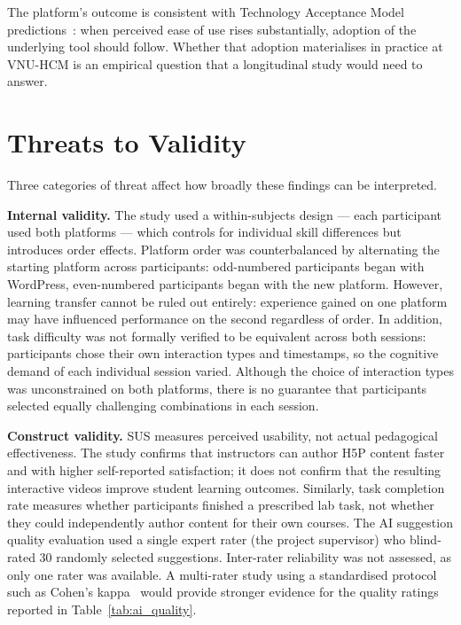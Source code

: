 The platform's outcome is consistent with Technology Acceptance Model predictions~\cite{davis1989}: when perceived ease of use rises substantially, adoption of the underlying tool should follow. Whether that adoption materialises in practice at VNU-HCM is an empirical question that a longitudinal study would need to answer.

\clearpage
\section{Threats to Validity}

Three categories of threat affect how broadly these findings can be interpreted.

\textbf{Internal validity.} The study used a within-subjects design --- each participant used both platforms --- which controls for individual skill differences but introduces order effects. Platform order was counterbalanced by alternating the starting platform across participants: odd-numbered participants began with WordPress, even-numbered participants began with the new platform. However, learning transfer cannot be ruled out entirely: experience gained on one platform may have influenced performance on the second regardless of order. In addition, task difficulty was not formally verified to be equivalent across both sessions: participants chose their own interaction types and timestamps, so the cognitive demand of each individual session varied. Although the choice of interaction types was unconstrained on both platforms, there is no guarantee that participants selected equally challenging combinations in each session.

\textbf{Construct validity.} SUS measures perceived usability, not actual pedagogical effectiveness. The study confirms that instructors can author H5P content faster and with higher self-reported satisfaction; it does not confirm that the resulting interactive videos improve student learning outcomes. Similarly, task completion rate measures whether participants finished a prescribed lab task, not whether they could independently author content for their own courses. The AI suggestion quality evaluation used a single expert rater (the project supervisor) who blind-rated 30 randomly selected suggestions. Inter-rater reliability was not assessed, as only one rater was available. A multi-rater study using a standardised protocol such as Cohen's kappa~\cite{cohen1960} would provide stronger evidence for the quality ratings reported in Table~\ref{tab:ai_quality}.

